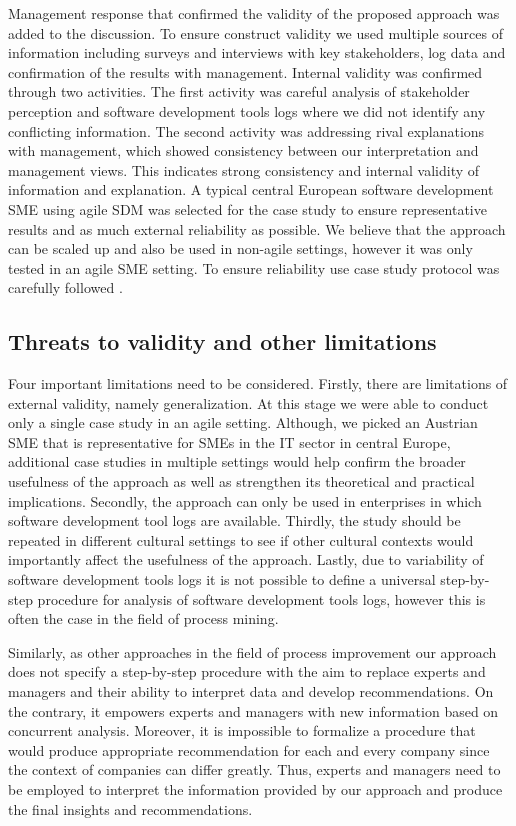 Management response that confirmed the validity of the proposed approach was added to the discussion. To ensure construct validity we used multiple sources of information including surveys and interviews with key stakeholders, log data and confirmation of the results with management. Internal validity was confirmed through two activities. The first activity was careful analysis of stakeholder perception and software development tools logs where we did not identify any conflicting information. The second activity was addressing rival explanations with management, which showed consistency between our interpretation and management views.  This indicates strong consistency and internal validity of information and explanation.  A typical central European software development SME using agile SDM was selected for the case study to ensure representative results and as much external reliability as possible. We believe that the approach can be scaled up and also be used in non-agile settings, however it was only tested in an agile SME setting. To ensure reliability use case study protocol was carefully followed \citep{yin2009case}.	


\subsection{Threats to validity and other limitations}

Four important limitations need to be considered. Firstly, there are limitations of external validity, namely generalization. At this stage we were able to conduct only a single case study in an agile setting. Although, we picked an Austrian SME that is representative for SMEs in the IT sector in central Europe, additional case studies in multiple settings would help confirm the broader usefulness of the approach as well as strengthen its theoretical and practical implications. Secondly, the approach can only be used in enterprises in which software development tool logs are available. Thirdly, the study should be repeated in different cultural settings to see if other cultural contexts would importantly affect the usefulness of the approach. Lastly, due to variability of software development tools logs it is not possible to define a universal step-by-step procedure for analysis of software development tools logs, however this is often the case in the field of process mining.

Similarly, as other approaches in the field of process improvement \citep{Zellner2011} our approach does not specify a step-by-step procedure with the aim to replace experts and managers and their ability to interpret data and develop recommendations. On the contrary, it empowers experts and managers with new information based on concurrent analysis. Moreover, it is impossible to formalize a procedure that would produce appropriate recommendation for each and every company since the context of companies can differ greatly. Thus, experts and managers need to be employed to interpret the information provided by our approach and produce the final insights and recommendations. 


